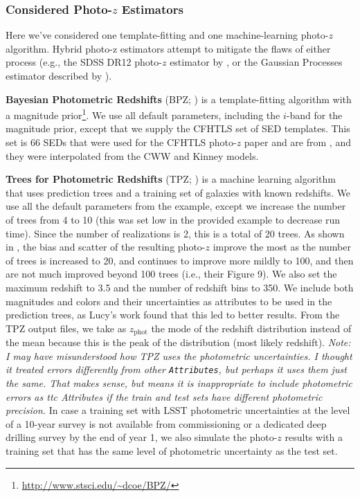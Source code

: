 \documentclass[DM,lsstdraft,toc]{lsstdoc}
\begin{document}
\subsubsection{Considered Photo-$z$ Estimators}\label{sssec:sel_ex_estimators}

Here we've considered one template-fitting and one machine-learning photo-$z$ algorithm. Hybrid photo-z estimators attempt to mitigate the flaws of either process (e.g., the SDSS DR12 photo-$z$ estimator by \citet{2016MNRAS.460.1371B}, or the Gaussian Processes estimator described by \citet{2017ApJ...838....5L}).

\textbf{Bayesian Photometric Redshifts} (BPZ; \citealt{2000ApJ...536..571B}) is a template-fitting algorithm with a magnitude prior\footnote{\url{http://www.stsci.edu/~dcoe/BPZ/}}. We use all default parameters, including the $i$-band for the magnitude prior, except that we supply the CFHTLS set of SED templates. This set is 66 SEDs that were used for the CFHTLS photo-$z$ paper and are from \cite{2006A&A...457..841I}, and they were interpolated from the CWW and Kinney models.

\textbf{Trees for Photometric Redshifts} (TPZ; \citealt{2013ascl.soft04011C,2013MNRAS.432.1483C}) is a machine learning algorithm that uses prediction trees and a training set of galaxies with known redshifts. We use all the default parameters from the example, except we increase the number of trees from 4 to 10 (this was set low in the provided example to decrease run time). Since the number of realizations is 2, this is a total of 20 trees. As shown in \cite{2013MNRAS.432.1483C}, the bias and scatter of the resulting photo-$z$ improve the most as the number of trees is increased to 20, and continues to improve more mildly to 100, and then are not much improved beyond 100 trees (i.e., their Figure 9). We also set the maximum redshift to 3.5 and the number of redshift bins to 350. We include both magnitudes and colors and their uncertainties as attributes to be used in the prediction trees, as Lucy's work found that this led to better results. From the TPZ output files, we take as $z_\mathrm{phot}$ the mode of the redshift distribution instead of the mean because this is the peak of the distribution (most likely redshift). \textit{Note: I may have misunderstood how TPZ uses the photometric uncertainties. I thought it treated errors differently from other \texttt{Attributes}, but perhaps it uses them just the same. That makes sense, but means it is inappropriate to include photometric errors as {ttc Attributes} if the train and test sets have different photometric precision.} In case a training set with LSST photometric uncertainties at the level of a 10-year survey is not available from commissioning or a dedicated deep drilling survey by the end of year 1, we also simulate the photo-$z$ results with a training set that has the same level of photometric uncertainty as the test set.
\end{document}
